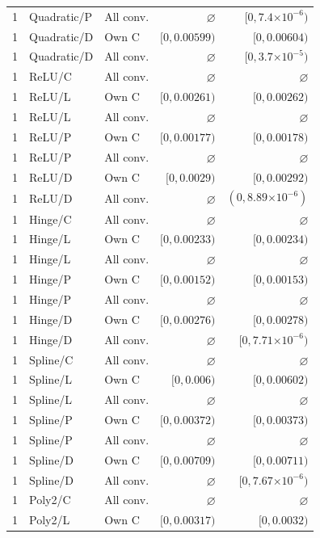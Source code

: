 \begin{longtable}{lllrr}
1 & Quadratic/P & All conv. & $\varnothing$ & $[0, 7.4\mathord{\times}10^{-6})$ \\
1 & Quadratic/D & Own C & $[0, 0.00599)$ & $[0, 0.00604)$ \\
1 & Quadratic/D & All conv. & $\varnothing$ & $[0, 3.7\mathord{\times}10^{-5})$ \\
1 & ReLU/C & All conv. & $\varnothing$ & $\varnothing$ \\
1 & ReLU/L & Own C & $[0, 0.00261)$ & $[0, 0.00262)$ \\
1 & ReLU/L & All conv. & $\varnothing$ & $\varnothing$ \\
1 & ReLU/P & Own C & $[0, 0.00177)$ & $[0, 0.00178)$ \\
1 & ReLU/P & All conv. & $\varnothing$ & $\varnothing$ \\
1 & ReLU/D & Own C & $[0, 0.0029)$ & $[0, 0.00292)$ \\
1 & ReLU/D & All conv. & $\varnothing$ & $(0, 8.89\mathord{\times}10^{-6})$ \\
1 & Hinge/C & All conv. & $\varnothing$ & $\varnothing$ \\
1 & Hinge/L & Own C & $[0, 0.00233)$ & $[0, 0.00234)$ \\
1 & Hinge/L & All conv. & $\varnothing$ & $\varnothing$ \\
1 & Hinge/P & Own C & $[0, 0.00152)$ & $[0, 0.00153)$ \\
1 & Hinge/P & All conv. & $\varnothing$ & $\varnothing$ \\
1 & Hinge/D & Own C & $[0, 0.00276)$ & $[0, 0.00278)$ \\
1 & Hinge/D & All conv. & $\varnothing$ & $[0, 7.71\mathord{\times}10^{-6})$ \\
1 & Spline/C & All conv. & $\varnothing$ & $\varnothing$ \\
1 & Spline/L & Own C & $[0, 0.006)$ & $[0, 0.00602)$ \\
1 & Spline/L & All conv. & $\varnothing$ & $\varnothing$ \\
1 & Spline/P & Own C & $[0, 0.00372)$ & $[0, 0.00373)$ \\
1 & Spline/P & All conv. & $\varnothing$ & $\varnothing$ \\
1 & Spline/D & Own C & $[0, 0.00709)$ & $[0, 0.00711)$ \\
1 & Spline/D & All conv. & $\varnothing$ & $[0, 7.67\mathord{\times}10^{-6})$ \\
1 & Poly2/C & All conv. & $\varnothing$ & $\varnothing$ \\
1 & Poly2/L & Own C & $[0, 0.00317)$ & $[0, 0.0032)$ \\

\end{longtable}
